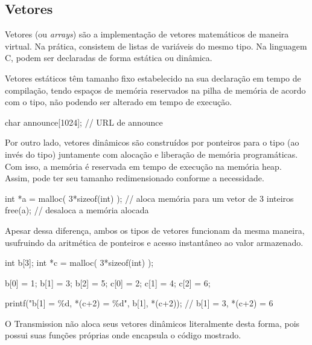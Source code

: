 
\subsection*{Vetores}

Vetores (ou \emph{arrays}) são a implementação de vetores matemáticos de maneira
virtual. Na prática, consistem de listas de variáveis do mesmo tipo. Na linguagem C,
podem ser declaradas de forma estática ou dinâmica.

Vetores estáticos têm tamanho fixo estabelecido na sua declaração em tempo de
compilação, tendo espaços de memória reservados na pilha de memória de acordo com o
tipo, não podendo ser alterado em tempo de execução.

\begin{ccode}
    char announce[1024]; // URL de announce
\end{ccode}

Por outro lado, vetores dinâmicos são construídos por ponteiros para o tipo (ao invés do
tipo) juntamente com alocação e liberação de memória programáticas. Com isso, a memória
é reservada em tempo de execução na memória heap. Assim, pode ter seu tamanho
redimensionado conforme a necessidade.

\begin{ccode}
    int *a = malloc( 3*sizeof(int) ); // aloca memória para um vetor de 3 inteiros
    free(a);                          // desaloca a memória alocada
\end{ccode}

Apesar dessa diferença, ambos os tipos de vetores funcionam da mesma maneira, usufruindo
da aritmética de ponteiros e acesso instantâneo ao valor armazenado.

\begin{ccode}
    int b[3];
    int *c = malloc( 3*sizeof(int) );

    b[0] = 1; b[1] = 3; b[2] = 5;
    c[0] = 2; c[1] = 4; c[2] = 6;

    printf("b[1] = \%d, *(c+2) = \%d\n", b[1], *(c+2)); // b[1] = 3, *(c+2) = 6
\end{ccode}

O Transmission não aloca seus vetores dinâmicos literalmente desta forma, pois possui
suas funções próprias onde encapsula o código mostrado.